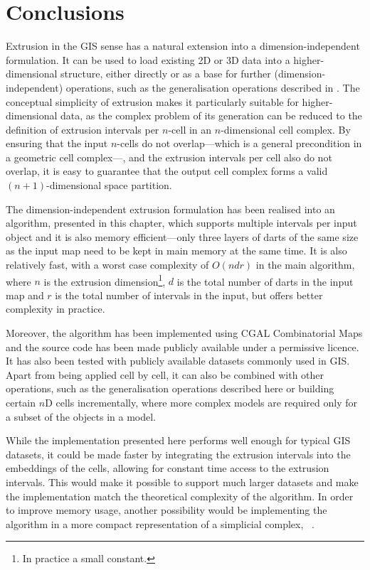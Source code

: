 \section{Conclusions}
\label{se:extrusion-conclusions}

Extrusion in the GIS sense has a natural extension into a dimension-independent formulation.
It can be used to load existing 2D or 3D data into a higher-dimensional structure, either directly or as a base for further (dimension-independent) operations, such as the generalisation operations described in .
The conceptual simplicity of extrusion makes it particularly suitable for higher-dimensional data, as the complex problem of its generation can be reduced to the definition of extrusion intervals per $n$-cell in an $n$-dimensional cell complex.
By ensuring that the input $n$-cells do not overlap---which is a general precondition in a geometric cell complex---, and the extrusion intervals per cell also do not overlap, it is easy to guarantee that the output cell complex forms a valid $(n+1)$-dimensional space partition.

The dimension-independent extrusion formulation has been realised into an algorithm, presented in this chapter, which supports multiple intervals per input object and it is also memory efficient---only three layers of darts of the same size as the input map need to be kept in main memory at the same time.
It is also relatively fast, with a worst case complexity of $O(ndr)$ in the main algorithm, where $n$ is the extrusion dimension\footnote{In practice a small constant.}, $d$ is the total number of darts in the input map and $r$ is the total number of intervals in the input, but offers better complexity in practice.

Moreover, the algorithm has been implemented using CGAL Combinatorial Maps and the source code has been made publicly available under a permissive licence.
It has also been tested with publicly available datasets commonly used in GIS.\@
Apart from being applied cell by cell, it can also be combined with other operations, such as the generalisation operations described here or building certain $n$D cells incrementally, where more complex models are required only for a subset of the objects in a model.

While the implementation presented here performs well enough for typical GIS datasets, it could be made faster by integrating the extrusion intervals into the embeddings of the cells, allowing for constant time access to the extrusion intervals.
This would make it possible to support much larger datasets and make the implementation match the theoretical complexity of the algorithm.
In order to improve memory usage, another possibility would be implementing the algorithm in a more compact representation of a simplicial complex, \eg\ \citet{Boissonnat12}.

